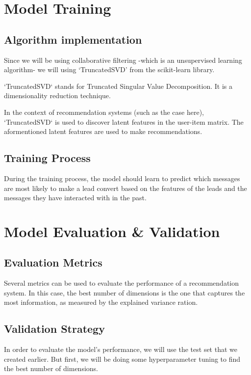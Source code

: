 \section{Model Training}

\subsection{Algorithm implementation}
Since we will be using collaborative filtering -which is an unsupervised learning algorithm- we will using `TruncatedSVD' from the scikit-learn library.

`TruncatedSVD` stands for Truncated Singular Value Decomposition.
It is a dimensionality reduction technique.

In the context of recommendation systems (such as the case here), `TruncatedSVD` is used to discover latent features in the user-item matrix. The aformentioned latent features are used to make recommendations.

\subsection{Training Process}
During the training process, the model should learn to predict which messages are most likely to make a lead convert based on the features of the leads and the messages they have interacted with in the past.

\section{Model Evaluation \& Validation}

\subsection{Evaluation Metrics}
Several metrics can be used to evaluate the performance of a recommendation system.
In this case, the best number of dimensions is the one that captures the most information, as measured by the explained variance ration.

\subsection{Validation Strategy}
In order to evaluate the model's performance, we will use the test set that we created earlier.
But first, we will be doing some hyperparameter tuning to find the best number of dimensions.

